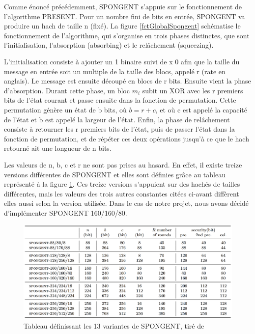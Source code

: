 				Comme énoncé précédemment, SPONGENT s'appuie sur le fonctionnement de
			l'algorithme PRESENT. Pour un nombre fini de bits en entrée, SPONGENT va
			produire un hach de taille n (fixé). La figure \ref{fctGlobalSpongent}
			schématise le fonctionnement de l'algorithme, qui s'organise en trois
			phases distinctes, que sont l'initialisation, l'absorption (absorbing) et
			le relâchement (squeezing).

			 	L'initialisation consiste à ajouter un 1 binaire suivi de x 0 afin que la
			taille du message en entrée soit un multiple de la taille des blocs, appelé
			r (rate en anglais). Le message est ensuite découpé en blocs de r bits.
			Ensuite vient la phase d'absorption. Durant cette phase, un bloc $m_{i}$
			subit un XOR avec les r premiers bits de l'état courant et passe ensuite
			dans la fonction de permutation. Cette permutation génère un état de b
			bits, où $b = r + c$, et où c est appelé la capacité de l'état et b est
			appelé la largeur de l'état. Enfin, la phase de relâchement consiste à
			retourner les r premiers bits de l'état, puis de passer l'état dans la
			fonction de permutation, et de répéter ces deux opérations jusqu'à ce que
			le hach retourné ait une longueur de n bits.

				Les valeurs de n, b, c et r ne sont pas prises au hasard. En effet, il
			existe treize versions différentes de SPONGENT et elles sont définies grâce
			au tableau représenté à la figure \ref{variantesSpongent}. Ces treize
			versions s'appuient sur des hachés de tailles différentes, mais les valeurs
			des trois autres constantes citées ci-avant diffèrent elles aussi selon la
			version utilisée. Dans le cas de notre projet, nous avons décidé
			d'implémenter SPONGENT 160/160/80.

			\begin{figure}[!h]
				\centering
				\includegraphics[width=\textwidth]{imgs/Spongent/varianteSpongent.png}
				\caption{Tableau définissant  les 13 variantes de SPONGENT, tiré de \cite{6275435}}
				\label{variantesSpongent}
	 		\end{figure}

